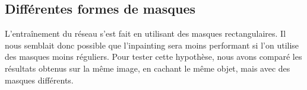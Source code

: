 \documentclass[12pt]{article}
\begin{document}
\subsection{Différentes formes de masques}

L'entraînement du réseau s'est fait en utilisant des masques rectangulaires. Il nous semblait donc possible que l'inpainting sera moins performant si l'on utilise des masques moins réguliers. Pour tester cette hypothèse, nous avons comparé les résultats obtenus sur la même image, en cachant le même objet, mais avec des masques différents.

\begin{figure}[htb]
\centering
  \hfill

\end{figure}
\end{document}
